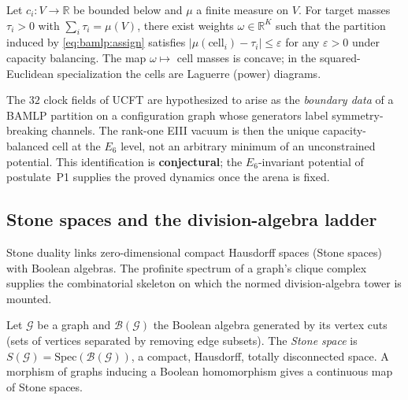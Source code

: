 \begin{theorem}\label{thm:bamlp:dual}
Let $c_i:V\to\mathbb{R}$ be bounded below and $\mu$ a finite measure on $V$.
For target masses $\tau_i>0$ with $\sum_i\tau_i=\mu(V)$, there exist weights
$\omega\in\mathbb{R}^K$ such that the partition induced by
\eqref{eq:bamlp:assign} satisfies $|\mu(\mathrm{cell}_i)-\tau_i|\le\varepsilon$
for any $\varepsilon>0$ under capacity balancing. The map $\omega\mapsto$ cell
masses is concave; in the squared-Euclidean specialization the cells are
Laguerre (power) diagrams.
\end{theorem}

\begin{remark}\label{rem:bamlp:ucft}
The $32$ clock fields of UCFT are hypothesized to arise as the \emph{boundary
data} of a BAMLP partition on a configuration graph whose generators label
symmetry-breaking channels. The rank-one EIII vacuum is then the unique
capacity-balanced cell at the $E_6$ level, not an arbitrary minimum of an
unconstrained potential. This identification is \textbf{conjectural}; the
$E_6$-invariant potential of postulate~\textnormal{P1} supplies the proved
dynamics once the arena is fixed.
\end{remark}

\subsection{Stone spaces and the division-algebra ladder}
\label{sec:bamlp:stone}

Stone duality links zero-dimensional compact Hausdorff spaces (Stone spaces)
with Boolean algebras. The profinite spectrum of a graph's clique complex
supplies the combinatorial skeleton on which the normed division-algebra tower
is mounted.

\begin{definition}\label{def:bamlp:stone}
Let $\mathcal{G}$ be a graph and $\mathcal{B}(\mathcal{G})$ the Boolean algebra
generated by its vertex cuts (sets of vertices separated by removing edge
subsets). The \emph{Stone space} is $S(\mathcal{G})=\mathrm{Spec}(\mathcal{B}
(\mathcal{G}))$, a compact, Hausdorff, totally disconnected space. A morphism of
graphs inducing a Boolean homomorphism gives a continuous map of Stone spaces.
\end{definition}

